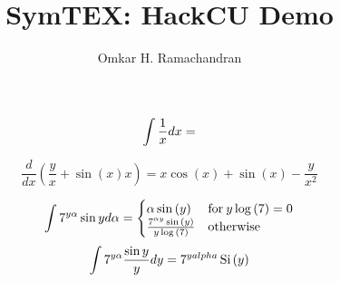\documentclass[english]{article}
\newcommand{\eval}[1]{\immediate\write18{python3 symtex.py '#1' > intermediate.txt}}
\begin{document}
\title{SymTEX: HackCU Demo}

\author{Omkar H. Ramachandran}
\maketitle

%

$$ \intop{\frac{1}{x} dx} = \eval{\intop{frac{1}{x} dx}} $$


$$
\frac{d}{dx}{(\frac{y}{x}+\sin(x)x)}=x \cos{\left (x \right )} + \sin{\left (x \right )} - \frac{y}{x^{2}}
$$

$$
\intop{7^{y\alpha} \sin{y} d\alpha}=\begin{cases} \alpha \sin{\left (y \right )} & \text{for}\: y \log{\left (7 \right )} = 0 \\\frac{7^{\alpha y} \sin{\left (y \right )}}{y \log{\left (7 \right )}} & \text{otherwise} \end{cases}
$$
$$
\intop{7^{y\alpha} \frac{\sin{y}}{y} dy}=7^{yalpha} \operatorname{Si}{\left (y \right )}
$$
\end{document}
